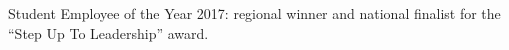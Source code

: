 Student Employee of the Year 2017: regional winner and national finalist for the ``Step Up To Leadership'' award.
\sectionsep{}
